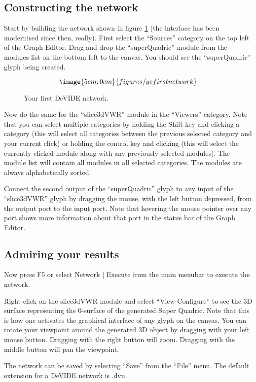 \subsection{Constructing the network}
Start by building the network shown in figure \ref{figGFN} (the
interface has been modernised since then, really).  First select the
``Sources'' category on the top left of the Graph Editor.  Drag and
drop the ``superQuadric'' module from the modules list on the bottom
left to the canvas.  You should see the ``superQuadric'' glyph being
created.

\begin{figure}
$$\image{5cm;0cm}{figures/gefirstnetwork}$$
\caption{Your first DeVIDE network.}\label{figGFN}
\end{figure}

Now do the same for the ``slice3dVWR'' module in the ``Viewers''
category.  Note that you can select multiple categories by holding the
Shift key and clicking a category (this will select all categories between the
previous selected category and your current click) or holding the
control key and clicking (this will select the currently clicked
module along with any previously selected modules).  The module list
will contain all modules in all selected categories.  The modules are
always alphabetically sorted.

Connect the second output of the ``superQuadric'' glyph to any input
of the ``slice3dVWR'' glyph by dragging the mouse, with the left
button depressed, from the output port to the input port.  Note that
hovering the mouse pointer over any port shows more information about
that port in the status bar of the Graph Editor.

\subsection{Admiring your results}
Now press F5 or select Network | Execute from the main menubar to
execute the network.

Right-click on the slice3dVWR module and select ``View-Configure'' to
see the 3D surface representing the 0-surface of the generated Super
Quadric.  Note that this is how one activates the graphical interface
of any glyph on the canvas.  You can rotate your viewpoint around the
generated 3D object by dragging with your left mouse button.  Dragging
with the right button will zoom.  Dragging with the middle button will
pan the viewpoint.

The network can be saved by selecting ``Save'' from the ``File''
menu.  The default extension for a DeVIDE network is .dvn.

